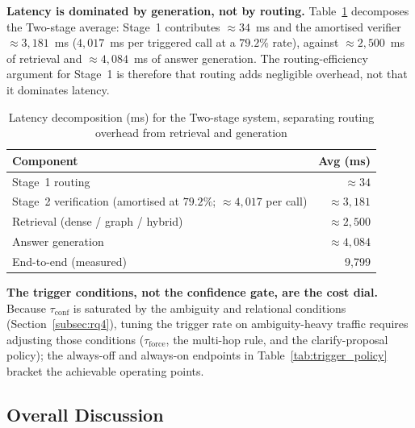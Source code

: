 \documentclass[pdflatex,sn-mathphys-num]{sn-jnl}
\begin{document}
\noindent\textbf{Latency is dominated by generation, not by routing.}
Table~\ref{tab:latency_decomp} decomposes the Two-stage average: Stage~1
contributes $\approx\!34$~ms and the amortised verifier
$\approx\!3{,}181$~ms ($4{,}017$~ms per triggered call at a $79.2\%$ rate),
against $\approx\!2{,}500$~ms of retrieval and $\approx\!4{,}084$~ms of
answer generation. The routing-efficiency argument for Stage~1 is therefore
that routing adds negligible overhead, not that it dominates latency.

\begin{table}[!htbp]
\centering
\caption{Latency decomposition (ms) for the Two-stage system, separating
routing overhead from retrieval and generation}\label{tab:latency_decomp}
\begin{tabular}{lr}
\toprule
\textbf{Component} & \textbf{Avg (ms)} \\
\midrule
Stage~1 routing            & $\approx 34$ \\
Stage~2 verification (amortised at $79.2\%$; $\approx 4{,}017$ per call) & $\approx 3{,}181$ \\
Retrieval (dense / graph / hybrid) & $\approx 2{,}500$ \\
Answer generation          & $\approx 4{,}084$ \\
\midrule
End-to-end (measured)      & 9{,}799 \\
\bottomrule
\end{tabular}
\end{table}

\noindent\textbf{The trigger conditions, not the confidence gate, are the
cost dial.} Because $\tau_{\mathrm{conf}}$ is saturated by the ambiguity and
relational conditions (Section~\ref{subsec:rq4}), tuning the trigger rate on
ambiguity-heavy traffic requires adjusting those conditions
($\tau_{\mathrm{force}}$, the multi-hop rule, and the clarify-proposal
policy); the always-off and always-on endpoints in
Table~\ref{tab:trigger_policy} bracket the achievable operating points.

\subsection{Overall Discussion}\label{subsec:discussion}
\end{document}
